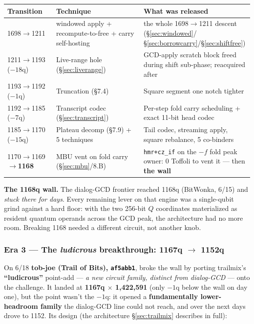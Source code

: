 \documentclass[11pt,a4paper]{article}
\begin{document}
\begin{center}
\begin{tabular}{p{3.8cm}p{4.5cm}p{5.2cm}}
\toprule
\textbf{Transition} & \textbf{Technique} & \textbf{What was released} \\
\midrule
1698$\to$1211 & windowed apply + recompute-to-free + carry self-hosting & the whole 1698$\to$1211 descent (\S\ref{sec:windowed}/\S\ref{sec:borrowcarry}/\S\ref{sec:shiftfree}) \\
1211$\to$1193 ($-18$q) & Live-range hole (\S\ref{sec:liverange}) & GCD-apply scratch block freed during shift sub-phase; reacquired after \\
1193$\to$1192 ($-1$q) & Truncation (\S7.4) & Square segment one notch tighter \\
1192$\to$1185 ($-7$q) & Transcript codec (\S\ref{sec:transcript}) & Per-step fold carry scheduling + exact 11-bit head codec \\
1185$\to$1170 ($-15$q) & Plateau decomp (\S7.9) + 5 techniques & Tail codec, streaming apply, square rebalance, 5 co-binders \\
1170$\to$1169$\to$\textbf{1168} & MBU vent on fold carry (\S\ref{sec:mbu}/8.B) & \texttt{hmr+cz\_if} on the $-f$ fold peak owner: 0 Toffoli to vent it --- then \textbf{the wall} \\
\bottomrule
\end{tabular}
\end{center}

\textbf{The 1168q wall.} The dialog-GCD frontier reached 1168q (BitWonka, 6/15) and \emph{stuck there
for days}. Every remaining lever on that engine was a single-qubit grind against a hard floor: with
the two 256-bit $Q$ coordinates materialized as resident quantum operands across the GCD peak, the
architecture had no more room. Breaking 1168 needed a different circuit, not another knob.

\subsubsection{Era 3 --- The \emph{ludicrous} breakthrough: 1167q $\to$ 1152q}

On 6/18 \textbf{tob-joe (Trail of Bits), \texttt{af5abb1}}, broke the wall by porting trailmix's
\textbf{``ludicrous''} point-add --- \emph{a new circuit family, distinct from dialog-GCD} --- onto
the challenge. It landed at \textbf{1167q $\times$ 1{,}422{,}591} (only $-1$q below the wall on day
one), but the point wasn't the $-1$q: it opened a \textbf{fundamentally lower-headroom family} the
dialog-GCD line could not reach, and over the next days drove to 1152. Its design (the architecture
\S\ref{sec:trailmix} describes in full):
\end{document}
